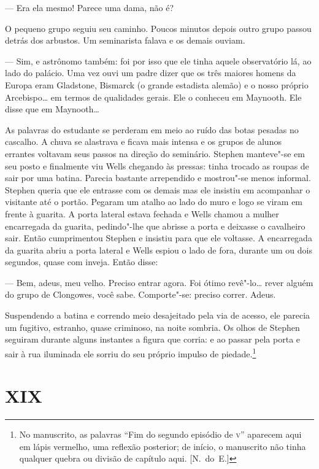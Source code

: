--- Era ela mesmo!  Parece uma dama, não é?

O pequeno grupo seguiu seu caminho.  Poucos minutos depois outro
grupo passou detrás dos arbustos.  Um seminarista falava e os demais
ouviam.

--- Sim, e astrônomo também: foi por isso que ele tinha
aquele observatório lá, ao lado do palácio.  Uma vez ouvi
um padre dizer que os três maiores homens da Europa eram Gladstone,
Bismarck (o grande estadista alemão) e o nosso próprio Arcebispo\ldots{} em
termos de qualidades gerais.  Ele o conheceu em Maynooth.  Ele disse
que em Maynooth\ldots{}

As palavras do estudante se perderam em meio ao ruído das botas
pesadas no cascalho.  A chuva se alastrava e ficava mais intensa e os
grupos de alunos errantes voltavam seus passos na direção do seminário.
Stephen manteve"-se em seu posto e finalmente viu Wells chegando às
pressas: tinha trocado as roupas de sair por uma batina.  Parecia
bastante arrependido e mostrou"-se menos informal.  Stephen queria que
ele entrasse com os demais mas ele insistiu em acompanhar o visitante
até o portão.  Pegaram um atalho ao lado do muro e logo se viram em
frente à guarita. A porta lateral estava fechada e Wells
chamou a mulher encarregada da guarita, pedindo"-lhe que abrisse a porta
e deixasse o cavalheiro sair.  Então cumprimentou Stephen e insistiu
para que ele voltasse.  A encarregada da guarita abriu a porta lateral
e Wells espiou o lado de fora, durante um ou dois segundos, quase com
inveja.  Então disse:

--- Bem, adeus, meu velho.  Preciso entrar agora.  Foi ótimo
revê"-lo\ldots{} rever alguém do grupo de Clongowes, você sabe.  Comporte"-se:
preciso correr.  Adeus.

Suspendendo a batina e correndo meio desajeitado pela via de acesso,
ele \label{parecia"-um} parecia um fugitivo, estranho, quase criminoso, na noite
sombria.  Os olhos de Stephen seguiram durante alguns instantes a
figura que corria: e ao passar pela porta e sair à rua iluminada ele
sorriu do seu próprio impulso de piedade.\footnote{ No manuscrito, as
palavras “Fim do segundo episódio de \textsc{v}” aparecem aqui em lápis
vermelho, uma reflexão posterior; de início, o manuscrito não tinha
qualquer quebra ou divisão de capítulo aqui. [N.~do~E.]}


\section*{XIX}

